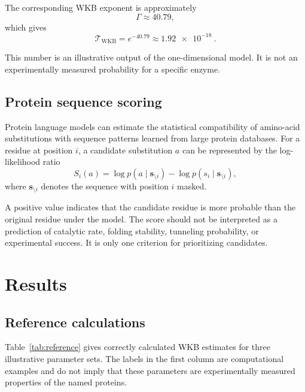 \documentclass[11pt,a4paper]{article}
\newcommand{\WKB}{\mathrm{WKB}}
\newcommand{\trans}{\mathcal{T}}
\begin{document}
The corresponding WKB exponent is approximately
\[
\Gamma\approx 40.79,
\]
which gives
\begin{equation}
\trans_{\WKB}
=
e^{-40.79}
\approx
\SI{1.92e-18}{}.
\label{eq:reference_result}
\end{equation}

This number is an illustrative output of the one-dimensional model. It is not
an experimentally measured probability for a specific enzyme.

\subsection{Protein sequence scoring}

Protein language models can estimate the statistical compatibility of amino-acid
substitutions with sequence patterns learned from large protein databases. For
a residue at position $i$, a candidate substitution $a$ can be represented by
the log-likelihood ratio
\begin{equation}
S_i(a)
=
\log p(a\mid \mathbf{s}_{\setminus i})
-
\log p(s_i\mid \mathbf{s}_{\setminus i}),
\label{eq:language_score}
\end{equation}
where $\mathbf{s}_{\setminus i}$ denotes the sequence with position $i$
masked.

A positive value indicates that the candidate residue is more probable than the
original residue under the model. The score should not be interpreted as a
prediction of catalytic rate, folding stability, tunneling probability, or
experimental success. It is only one criterion for prioritizing candidates.

\section{Results}

\subsection{Reference calculations}

Table~\ref{tab:reference} gives correctly calculated WKB estimates for three
illustrative parameter sets. The labels in the first column are computational
examples and do not imply that these parameters are experimentally measured
properties of the named proteins.
\end{document}
